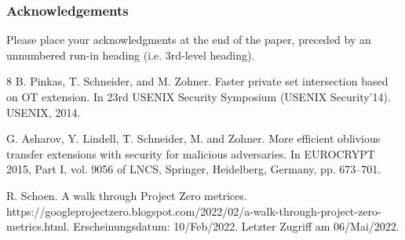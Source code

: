 \documentclass[runningheads]{llncs}
\begin{document}
\subsubsection{Acknowledgements} Please place your acknowledgments at
the end of the paper, preceded by an unnumbered run-in heading (i.e.
3rd-level heading).

%
%
%
% 
% 
%
\begin{thebibliography}{8}
B. Pinkas, T. Schneider, and M. Zohner. Faster private set intersection based on OT extension. In 23rd USENIX Security Symposium (USENIX Security’14). USENIX, 2014.


G. Asharov, Y. Lindell, T. Schneider, M. and Zohner. More efficient oblivious transfer extensions with security for malicious adversaries. In EUROCRYPT 2015, Part I, vol. 9056 of LNCS, Springer, Heidelberg, Germany, pp. 673–701.


R. Schoen. A walk through Project Zero metrices. https://googleprojectzero.blogspot.com/2022/02/a-walk-through-project-zero-metrics.html. Erscheinungsdatum: 10/Feb/2022. Letzter Zugriff am 06/Mai/2022. 

\end{thebibliography}
\end{document}
